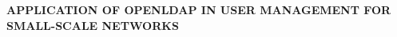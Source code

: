 \begin{center}
\textbf{APPLICATION OF OPENLDAP IN USER MANAGEMENT FOR SMALL-SCALE NETWORKS\\}
\end{center}